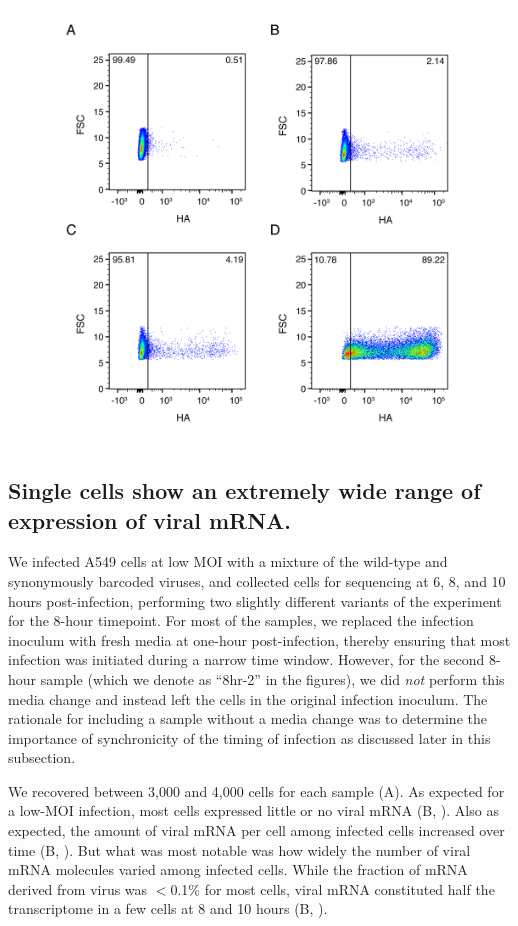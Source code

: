 \documentclass[9pt,lineno]{elife}
\begin{document}
\begin{figure}
{}{\includegraphics[width=0.7\linewidth]{figures/Validating_barcode_virus/HA_stain_supplement.png}}
\end{figure}

\subsection{Single cells show an extremely wide range of expression of viral mRNA.}
We infected A549 cells at low MOI with a mixture of the wild-type and synonymously barcoded viruses, and collected cells for sequencing at 6, 8, and 10 hours post-infection, performing two slightly different variants of the experiment for the 8-hour timepoint.
For most of the samples, we replaced the infection inoculum with fresh media at one-hour post-infection, thereby ensuring that most infection was initiated during a narrow time window.
However, for the second 8-hour sample (which we denote as ``8hr-2'' in the figures), we did \emph{not} perform this media change and instead left the cells in the original infection inoculum.
The rationale for including a sample without a media change was to determine the importance of synchronicity of the timing of infection as discussed later in this subsection.

We recovered between 3,000 and 4,000 cells for each sample (A). 
As expected for a low-MOI infection, most cells expressed little or no viral mRNA (B, ).
Also as expected, the amount of viral mRNA per cell among infected cells increased over time (B, ).
But what was most notable was how widely the number of viral mRNA molecules varied among infected cells.
While the fraction of mRNA derived from virus was $<$0.1\% for most cells, viral mRNA constituted half the transcriptome in a few cells at 8 and 10 hours (B, ).
\end{document}
